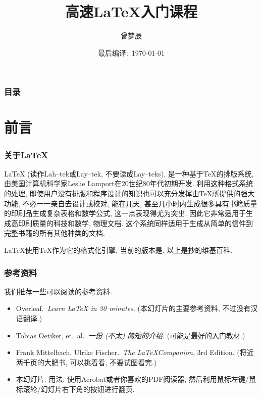 \documentclass{beamer}
\title{高速\LaTeX{}入门课程}
\author{曾梦辰}
\institute{北京师范大学OM学社}
\date{最后编译:\ \today}
\begin{document}
\maketitle

\begin{frame}
    \frametitle{目录}
    \tableofcontents
\end{frame}

\section{前言}

\begin{frame}
    \frametitle{关于\LaTeX{}}
    LaTeX (读作Lah--tek或Lay--tek, 不要读成Lay--teks), 是一种基于TeX的排版系统, 由美国计算机科学家Leslie Lamport在20世纪80年代初期开发.
    利用这种格式系统的处理, 即使用户没有排版和程序设计的知识也可以充分发挥由TeX所提供的强大功能, 不必一一亲自去设计或校对, 能在几天, 甚至几小时内生成很多具有书籍质量的印刷品生成复杂表格和数学公式, 这一点表现得尤为突出.
    因此它非常适用于生成高印刷质量的科技和数学, 物理文档.
    这个系统同样适用于生成从简单的信件到完整书籍的所有其他种类的文档.

    LaTeX使用TeX作为它的格式化引擎, 当前的版本是\LaTeXe.\pause
    \vspace{1cm}
    以上是抄的维基百科.
\end{frame}

\begin{frame}
    \frametitle{参考资料}
    我们推荐一些可以阅读的参考资料.\pause
    \begin{itemize}
        \item<2-> Overleaf.\ \emph{Learn LaTeX in 30 minutes}.
        (本幻灯片的主要参考资料, 不过没有汉语翻译.)
        \item<3-> Tobias Oetiker, et.~al.\ \emph{一份 (不太) 简短的\LaTeXe{}介绍}.
        (可能是最好的入门教材.)
        \item<4-> Frank Mittelbach, Ulrike Fischer.\ \emph{The \LaTeX Companion}, 3rd Edition.
        (将近两千页的大肥书, 可以挑着看, 不要试图看完.)
        \item<5-> 本幻灯片. 用法: 使用Acrobat或者你喜欢的PDF阅读器, 然后利用鼠标左键/鼠标滚轮/幻灯片右下角的按钮进行翻页.
    \end{itemize}
\end{frame}
\end{document}
